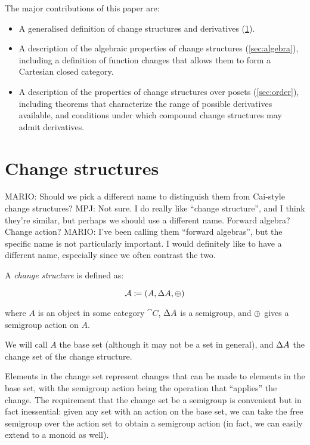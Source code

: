 The major contributions of this paper are:
\begin{itemize}
  \item A generalised definition of change structures and derivatives
    (\ref{sec:change-structures}).
  \item A description of the algebraic properties of change structures (\ref{sec:algebra}), including
    a definition of function changes that allows them to form a Cartesian closed
    category.
  \item A description of the properties of change structures over posets
    (\ref{sec:order}), including theorems that characterize the range of
    possible derivatives available, and conditions under which compound change
    structures may admit derivatives.
\end{itemize}

\section{Change structures}
\label{sec:change-structures}

MARIO: Should we pick a different name to distinguish them from Cai-style change structures?
MPJ: Not sure. I do really like ``change structure'', and I think they're
similar, but perhaps we should use a different name. Forward algebra? Change action?
MARIO: I've been calling them ``forward algebras'', but the specific name is not particularly
important. I would definitely like to have a different name, especially since we often contrast the two.
\begin{defn}

  A \textit{change structure} is defined as:

  $$\mathcal{A} \coloneqq (A,\Delta A,\oplus)$$

  where $A$ is an object in some category $\cat{C}$, $\Delta A$ is a semigroup, and $\oplus$ gives a semigroup action on $A$.

  We will call $A$ the base set (although it may not be a set in general), and $\Delta A$ the change set of the change structure.
\end{defn}

Elements in the change set represent changes that can be made to elements in the
base set, with the semigroup action being the operation that ``applies'' the
change. The requirement that the change set be a semigroup is convenient but in
fact inessential: given any set with an action on the base set, we can take the
free semigroup over the action set to obtain a semigroup action (in fact, we can
easily extend to a monoid as well).

